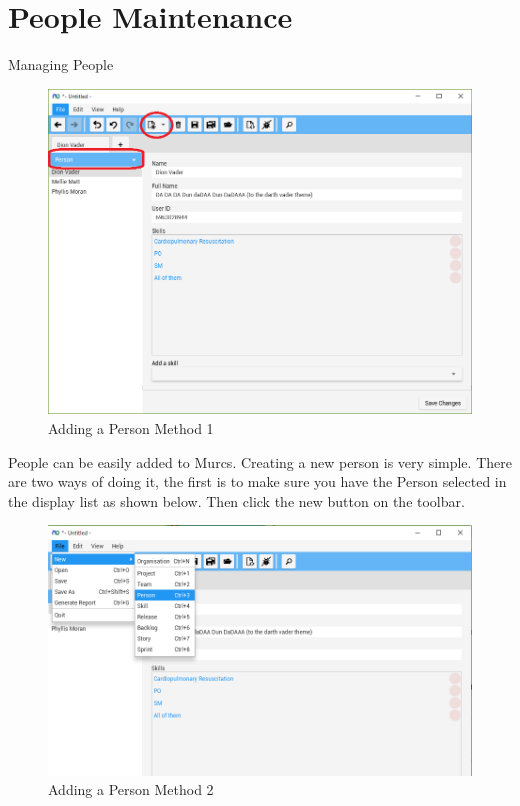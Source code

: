 \section{People Maintenance}

Managing People

\begin{figure}[H]
	\centering
	\includegraphics[width=\textwidth]{images/screenshots/people1.PNG}
	\caption{Adding a Person Method 1}
	\label{fig:new_project}
\end{figure}

People can be easily added to Murcs. 
\newline
Creating a new person is very simple. There are two ways of doing it, the first is to make sure you have the Person selected in the display list as shown below. Then click the new button on the toolbar.

\begin{figure}[H]
	\centering
	\includegraphics[width=\textwidth]{images/screenshots/people4.PNG}
	\caption{Adding a Person Method 2}
	\label{fig:new_project}
\end{figure}


